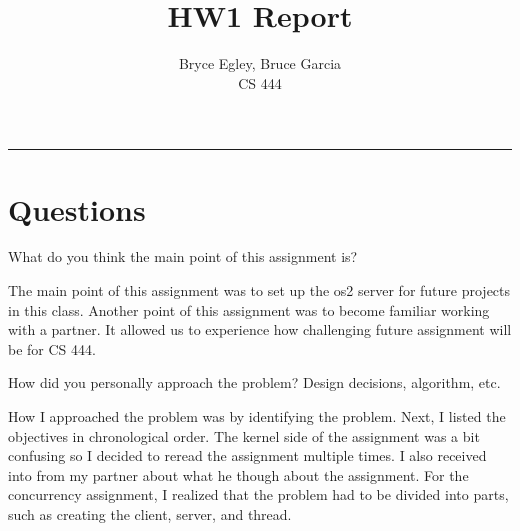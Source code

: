 \documentclass{article}
\newenvironment{question}[2][Question]{\begin{trivlist}
\item[\hskip \labelsep {\bfseries #1}\hskip \labelsep {\bfseries #2.}]}{\end{trivlist}}
\begin{document}

\title{HW1 Report} %
\author{Bryce Egley, Bruce Garcia\\CS 444} %

\maketitle
\hrule


%
%

\section*{Questions}

\begin{question}{1}
What do you think the main point of this assignment is?
\end{question}
The main point of this assignment was to set up the os2 server for future projects in this class. Another point of this assignment was to become familiar working with a partner. It allowed us to experience how challenging future assignment will be for CS 444. 


\vspace{0.25in} %

\begin{question}{2}
How did you personally approach the problem? Design decisions, algorithm, etc.\end{question}
How I approached the problem was by identifying the problem. Next, I listed the objectives in chronological order. The kernel side of the assignment was a bit confusing so I decided to reread the assignment multiple times. I also received into from my partner about what he though about the assignment.   
For the concurrency assignment, I realized that the problem had to be divided into parts, such as creating the client, server, and thread. 
\end{document}
